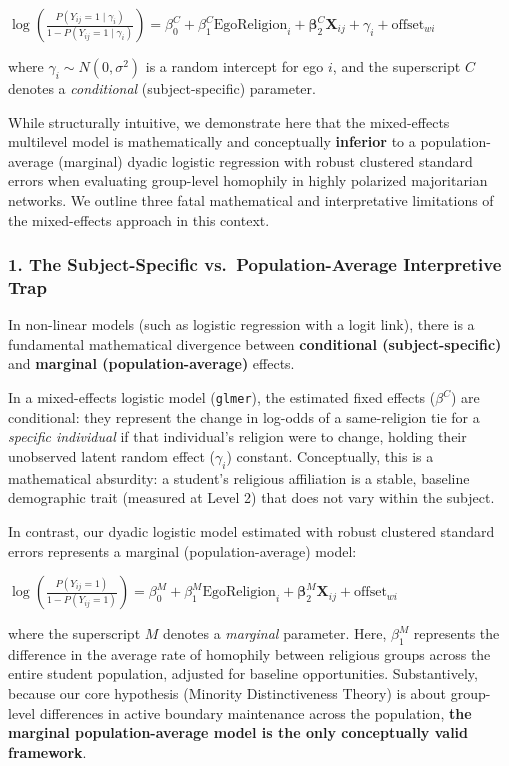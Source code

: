 \documentclass[
  letterpaper,
  DIV=11,
  numbers=noendperiod]{scrartcl}
\begin{document}
\(\log\left(\frac{P(Y_{ij} = 1 \mid \gamma_i)}{1 - P(Y_{ij} = 1 \mid \gamma_i)}\right) = \beta_0^C + \beta_1^C \text{EgoReligion}_i + \mathbf{\beta}_2^C \mathbf{X}_{ij} + \gamma_i + \text{offset}_{wi}\)

where \(\gamma_i \sim N(0, \sigma^2)\) is a random intercept for ego
\(i\), and the superscript \(C\) denotes a \emph{conditional}
(subject-specific) parameter.

While structurally intuitive, we demonstrate here that the mixed-effects
multilevel model is mathematically and conceptually \textbf{inferior} to
a population-average (marginal) dyadic logistic regression with robust
clustered standard errors when evaluating group-level homophily in
highly polarized majoritarian networks. We outline three fatal
mathematical and interpretative limitations of the mixed-effects
approach in this context.

\subsubsection{1. The Subject-Specific vs.~Population-Average
Interpretive
Trap}\label{the-subject-specific-vs.-population-average-interpretive-trap}

In non-linear models (such as logistic regression with a logit link),
there is a fundamental mathematical divergence between
\textbf{conditional (subject-specific)} and \textbf{marginal
(population-average)} effects.

In a mixed-effects logistic model (\texttt{glmer}), the estimated fixed
effects (\(\beta^C\)) are conditional: they represent the change in
log-odds of a same-religion tie for a \emph{specific individual} if that
individual's religion were to change, holding their unobserved latent
random effect (\(\gamma_i\)) constant. Conceptually, this is a
mathematical absurdity: a student's religious affiliation is a stable,
baseline demographic trait (measured at Level 2) that does not vary
within the subject.

In contrast, our dyadic logistic model estimated with robust clustered
standard errors represents a marginal (population-average) model:

\(\log\left(\frac{P(Y_{ij} = 1)}{1 - P(Y_{ij} = 1)}\right) = \beta_0^M + \beta_1^M \text{EgoReligion}_i + \mathbf{\beta}_2^M \mathbf{X}_{ij} + \text{offset}_{wi}\)

where the superscript \(M\) denotes a \emph{marginal} parameter. Here,
\(\beta_1^M\) represents the difference in the average rate of homophily
between religious groups across the entire student population, adjusted
for baseline opportunities. Substantively, because our core hypothesis
(Minority Distinctiveness Theory) is about group-level differences in
active boundary maintenance across the population, \textbf{the marginal
population-average model is the only conceptually valid framework}.
\end{document}
